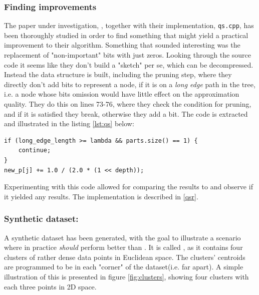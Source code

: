 \subsubsection{Finding improvements}
\label{finding_improvements}
The paper under investigation, \cite{wagner17}, together with their implementation, \texttt{qs.cpp}, has been thoroughly studied in order to find something that might yield a practical improvement to their algorithm. Something that sounded interesting was the replacement of "non-important" bits with just zeros. Looking through the source code it seems like they don't build a "sketch" per se, which can be decompressed. Instead the \qt{} data structure is built, including the pruning step, where they directly don't add bits to represent a node, if it is on a \textit{long edge} path in the tree, i.e. a node whose bits omission would have little effect on the approximation quality\cite[p. 3, l. 14]{wagner17}. They do this on lines 73-76, where they check the condition for pruning, and if it is satisfied they break, otherwise they add a bit. The code is extracted and illustrated in the listing \ref{lst:qs} below:

\begin{lstlisting}[caption={Pruning},label={lst:qs}]
if (long_edge_length >= lambda && parts.size() == 1) {
	continue;
}
new_p[j] += 1.0 / (2.0 * (1 << depth));
\end{lstlisting}

Experimenting with this code allowed for comparing the results to \qs{} and observe if it yielded any results. The implementation is described in \ref{qsr}.


\subsubsection{Synthetic dataset: \clust{}}
\label{clusters}
A synthetic dataset has been generated, with the goal to illustrate a scenario where \qsr{} in practice \textit{should} perform better than \qs{}. It is called \clust{}, as it contains four clusters of rather dense data points in Euclidean space. The clusters' centroids are programmed to be in each "corner" of the dataset(i.e. far apart). A simple illustration of this is presented in figure \ref{fig:clusters}, showing four clusters with each three points in 2D space.

